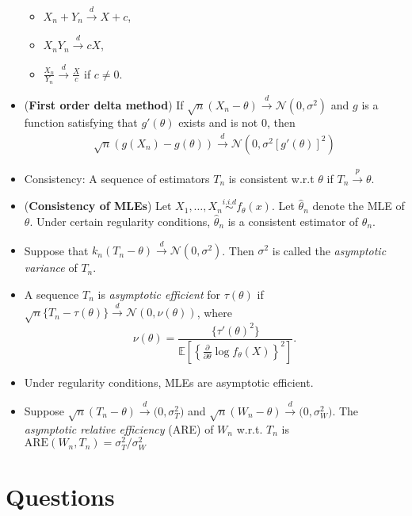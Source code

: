 \documentclass[12pt]{extarticle}
\newcommand{\E}{\mathbb E}
\newcommand{\N}{\mathcal N}
\begin{document}
\begin{itemize}
  	\begin{itemize}
  		\item $X_n+Y_n \xrightarrow{d} X+c$,
  		\item $X_nY_n \xrightarrow{d} cX$,
  		\item $\frac{X_n}{Y_n} \xrightarrow{d} \frac{X}{c}$ if $c \neq 0$.
  	\end{itemize}
  	\item (\textbf{First order delta method}) If $\sqrt{n}(X_n-\theta) \xrightarrow{d} \N(0,\sigma^2)$ and $g$ is a function satisfying that $g'(\theta)$ exists and is not 0, then
  	\begin{align*}
  	\sqrt{n}(g(X_n)-g(\theta)) \xrightarrow{d} \N(0,\sigma^2[g'(\theta)]^2)
  	\end{align*}
  	\item Consistency: A sequence of estimators $T_n$ is consistent w.r.t $\theta$ if $T_n\xrightarrow{p}\theta$. 
  	\item (\textbf{Consistency of MLEs}) Let $X_1,\ldots,X_n\overset{i.i.d}{\sim}f_\theta(x)$. Let $\hat\theta_n$ denote the MLE of $\theta$. Under certain regularity conditions, $\hat\theta_n$ is a consistent estimator of $\theta_n$.
  	\item Suppose that $k_n(T_n - \theta)\xrightarrow{d}\mathcal N(0,\sigma^2)$. Then $\sigma^2$ is called the \textit{asymptotic variance} of $T_n$.
  	\item A sequence $T_n$ is \textit{asymptotic efficient} for $\tau(\theta)$ if $\sqrt{n}\{T_n - \tau(\theta)\}\xrightarrow{d}\mathcal N(0, \nu(\theta))$, where
  	$$\nu(\theta) = \dfrac{\{\tau'(\theta)^2\}}{\E\left[\left\{\frac{\partial}{\partial\theta}\log f_\theta(X)\right\}^2\right]}.$$
  	\item Under regularity conditions, MLEs are asymptotic efficient.
  	\item Suppose $\sqrt{n}(T_n - \theta)\xrightarrow{d}\mathcal(0, \sigma_T^2)$ and $\sqrt{n}(W_n - \theta)\xrightarrow{d}\mathcal(0, \sigma_W^2)$. The \textit{asymptotic relative efficiency} (ARE) of $W_n$ w.r.t. $T_n$ is 
  	$\text{ARE}(W_n, T_n) = {\sigma_T^2}/{\sigma_W^2}$
  \end{itemize}
  
  \section{Questions}
  
\end{document}
